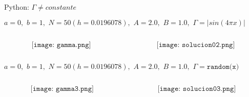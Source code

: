 \documentclass[handout]{beamer}
\begin{document}
\begin{frame}[fragile]{Python: $\Gamma \neq constante$}

{\footnotesize 
$a = 0, \,\, b = 1, \,\, N = 50 (h = 0.0196078), \,\, A = 2.0, \,\, B = 1.0, \,\, \Gamma = |sin(4 \pi x)|$
}
	\begin{columns}
		\begin{column}{0.5\textwidth}
			$$\texttt{[image: gamma.png]}$$
		\end{column}
		\begin{column}{0.5\textwidth}  %
			$$\texttt{[image: solucion02.png]}$$
		\end{column}
	\end{columns}

{\footnotesize 
	$a = 0, \,\, b = 1, \,\, N = 50 (h = 0.0196078), \,\, A = 2.0, \,\, B = 1.0, \,\, \Gamma = \texttt{random(x)}$
}
	\begin{columns}
		\begin{column}{0.5\textwidth}
			$$\texttt{[image: gamma3.png]}$$
		\end{column}
		\begin{column}{0.5\textwidth}  %
			$$\texttt{[image: solucion03.png]}$$
		\end{column}
	\end{columns}
	
\end{frame}
\end{document}
